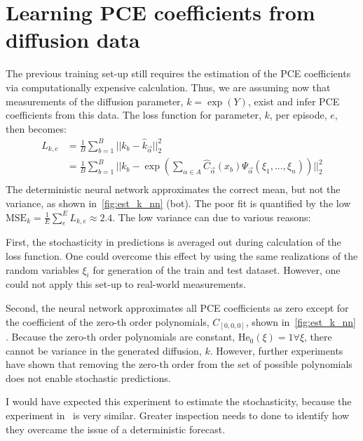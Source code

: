 \documentclass[letterpaper, 10 pt, conference, twocolumn]{ieeeconf}  %
\begin{document}
\section{Learning PCE coefficients from diffusion data}\label{sec:coef_data}
The previous training set-up still requires the estimation of the PCE coefficients via computationally expensive calculation. Thus, we are assuming now that measurements of the diffusion parameter, $k=\exp(Y)$, exist and infer PCE coefficients from this data. The loss function for parameter, $k$, per episode, $e$, then becomes:
\begin{equation}
\begin{aligned}
  L_{k,e} &= \frac{1}{B}\sum_{b=1}^B \lvert\lvert k_b - \hat k_{\vec\alpha}\rvert\rvert_2^2\\
  &= \frac{1}{B}\sum_{b=1}^B \lvert\lvert k_b - \exp(\sum_{\alpha \in A} \hat C_{\vec\alpha}(x_b)\Psi_{\vec\alpha}(\xi_1, ..., \xi_n))\rvert\rvert_2^2\\
\end{aligned}
\label{eq:loss_k}
\end{equation}
The deterministic neural network approximates the correct mean, but not the variance, as shown in~\cref{fig:est_k_nn} (bot). The poor fit is quantified by the low $\text{MSE}_k = \frac{1}{E}\sum_e^E L_{k,e}\approx 2.4$. The low variance can due to various reasons:

First, the stochasticity in predictions is averaged out during calculation of the loss function. One could overcome this effect by using the same realizations of the random variables $\xi_i$ for generation of the train and test dataset. However, one could not apply this set-up to real-world measurements. 

Second, the neural network approximates all PCE coefficients as zero except for the coefficient of the zero-th order polynomials, $C_{[0,0,0]}$, shown in~\cref{fig:est_k_nn} . Because the zero-th order polynomials are constant, $\text{He}_0(\xi)=1\forall \xi$, there cannot be variance in the generated diffusion, $k$. However, further experiments have shown that removing the zero-th order from the set of possible polynomials does not enable stochastic predictions. 

I would have expected this experiment to estimate the stochasticity, because the experiment in~\cite{Zhang_2020} is very similar. Greater inspection needs to done to identify how they overcame the issue of a deterministic forecast. 
\end{document}
